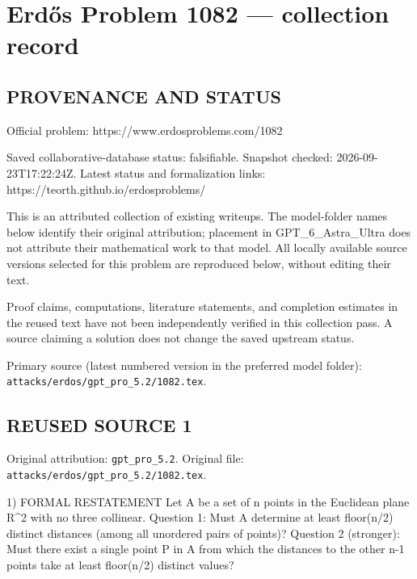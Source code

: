 \section*{Erd\H{o}s Problem 1082 --- collection record}

\subsection*{PROVENANCE AND STATUS}
Official problem: https://www.erdosproblems.com/1082

Saved collaborative-database status: falsifiable.
Snapshot checked: 2026-09-23T17:22:24Z.
Latest status and formalization links: https://teorth.github.io/erdosproblems/

This is an attributed collection of existing writeups. The model-folder names below identify their original attribution; placement in GPT\_6\_Astra\_Ultra does not attribute their mathematical work to that model. All locally available source versions selected for this problem are reproduced below, without editing their text.

Proof claims, computations, literature statements, and completion estimates in the reused text have not been independently verified in this collection pass. A source claiming a solution does not change the saved upstream status.

Primary source (latest numbered version in the preferred model folder): \texttt{attacks/erdos/gpt\_pro\_5.2/1082.tex}.

\subsection*{REUSED SOURCE 1}
Original attribution: \texttt{gpt\_pro\_5.2}.
Original file: \texttt{attacks/erdos/gpt\_pro\_5.2/1082.tex}.


1) FORMAL RESTATEMENT
Let A be a set of n points in the Euclidean plane R^2 with no three collinear.
Question 1: Must A determine at least floor(n/2) distinct distances (among all unordered pairs of points)?
Question 2 (stronger): Must there exist a single point P in A from which the distances to the other n-1 points take at least floor(n/2) distinct values?

